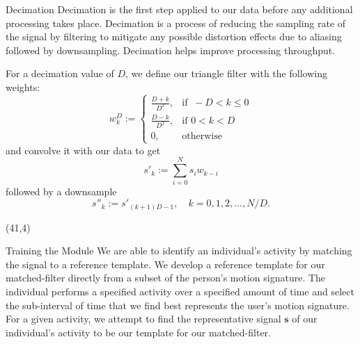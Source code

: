 \documentclass[unknownkeysallowed,final]{beamer}
\begin{document}
\begin{frame}{}
\begin{textblock}{18}
\begin{block}{\small{Decimation}}
Decimation is the first step applied to our data before any additional processing takes place.
Decimation is a process of reducing the sampling rate of the signal by filtering to mitigate any possible distortion effects due to aliasing followed by downsampling.
Decimation helps improve processing throughput.

For a decimation value of $D$, we define our triangle filter with the following weights:
%
\begin{equation} \label{eq:triangle_filter_weights}
w_k^D :=
\begin{cases}
  \frac{D+k}{D^2}, & \text{if }\ -D < k \leq 0 \\
  \frac{D-k}{D^2}, & \text{if } 0 < k < D \\
  0, & \text{otherwise}
\end{cases}
\end{equation}
%
and convolve it with our data to get
%
\begin{equation} \label{eq:convolve}
s'_k := \sum_{i=0}^{N} s_i w_{k-i}
\end{equation}
%
followed by a downsample
%
\begin{equation} \label{eq:downsample}
s''_k := s'_{(k+1)D-1}, \quad k = 0, 1, 2, ..., N/D.
\end{equation}
%
\end{block}

\end{textblock}
\begin{textblock}{17.3}(41,4)

\begin{block}{\small{Training the Module}}
We are able to identify an individual's activity by matching the signal to a reference template.
We develop a reference template for our matched-filter directly from a subset of the person's motion signature.
The individual performs a specified activity over a specified amount of time and select the sub-interval of time that we find best represents the user's motion signature.
For a given activity, we attempt to find the representative signal $\textbf{s}$ of our individual's activity to be our template for our matched-filter.


\end{block}
\end{textblock}
\end{frame}
\end{document}
